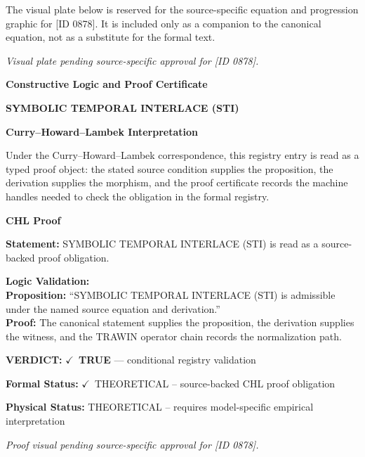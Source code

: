 \begingroup\footnotesize\sloppy
The visual plate below is reserved for the source-specific equation and progression graphic for [ID 0878]. It is included only as a companion to the canonical equation, not as a substitute for the formal text.
\par\endgroup
\begingroup\footnotesize\itshape
Visual plate pending source-specific approval for [ID 0878].
\par\endgroup

\clearpage
\begingroup\tzpsupportsetup
\noindent\textbf{\fontsize{10.8pt}{12.8pt}\selectfont [ID 0878] Constructive Logic and Proof Certificate}\par
\noindent\textbf{\fontsize{10pt}{12pt}\selectfont SYMBOLIC TEMPORAL INTERLACE (STI)}\par
\vspace{0.45em}
\begingroup
\footnotesize
\setlength{\parskip}{0.22em}
\setlength{\parindent}{0pt}
\noindent\textbf{Curry--Howard--Lambek Interpretation}\par
Under the Curry--Howard--Lambek correspondence, this registry entry is read as a typed proof
object: the stated source condition supplies the proposition, the derivation supplies the
morphism, and the proof certificate records the machine handles needed to check the obligation
in the formal registry.

\vspace{0.45em}
\noindent\textbf{CHL Proof}\par
\textbf{Statement:} SYMBOLIC TEMPORAL INTERLACE (STI) is read as a source-backed proof obligation.

\textbf{Logic Validation:}\\
\textbf{Proposition:} ``SYMBOLIC TEMPORAL INTERLACE (STI) is admissible under the named source equation and derivation.''\\
\textbf{Proof:} The canonical statement supplies the proposition, the derivation supplies the witness, and the TRAWIN operator chain records the normalization path.

\textbf{VERDICT:} \ensuremath{\checkmark}\ \textbf{TRUE} --- conditional registry validation

\textbf{Formal Status:} \ensuremath{\checkmark}\ THEORETICAL -- source-backed CHL proof obligation

\textbf{Physical Status:} THEORETICAL -- requires model-specific empirical interpretation
\par\vspace{0.45em}
\par
\vfill
\begingroup\footnotesize\itshape
Proof visual pending source-specific approval for [ID 0878].
\par\endgroup
\vfill
\endgroup
\endgroup
